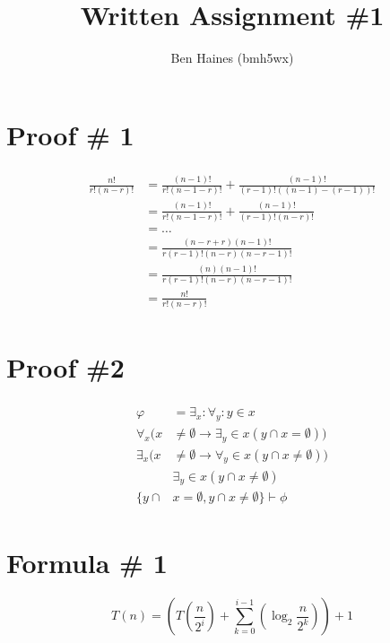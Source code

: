 \documentclass{article}
\begin{document}
\title{Written Assignment \#1}
\author{Ben Haines (bmh5wx)}

\section*{Proof \# 1}
\begin{align*}
    \begin{split}
        \frac{n!}{r!(n-r)!} &= \frac{(n-1)!}{r!(n-1-r)!} + \frac{(n-1)!}{(r-1)!((n-1)-(r-1))!}\\
                            &= \frac{(n-1)!}{r!(n-1-r)!} + \frac{(n-1)!}{(r-1)!(n-r)!}\\
                            &= \ldots\\
                            &= \frac{(n-r+r)(n-1)!}{r(r-1)!(n-r)(n-r-1)!}\\
                            &= \frac{(n)(n-1)!}{r(r-1)!(n-r)(n-r-1)!}\\
                            &= \frac{n!}{r!(n-r)!}
    \end{split}
\end{align*}

\section*{Proof \#2}
\begin{align*}
    \begin{split}
        \varphi &= \exists_x :\forall_y : y \in x\\
        \forall_x(x &\not= \emptyset \to \exists_y \in x(y\cap x = \emptyset))\\
        \exists_x(x &\not= \emptyset \to \forall_y \in x(y\cap x \not= \emptyset))\\
                    &\exists_y \in x(y\cap x \not= \emptyset)\\
        \{y\cap &x = \emptyset, y\cap x\not= \emptyset \} \vdash \phi
    \end{split}
\end{align*}

\section*{Formula \# 1}
$$T(n) = \left(T\left(\frac{n}{2^i}\right) + \sum\limits_{k=0}^{i-1}\left(\log_2\frac{n}{2^k}\right)\right) + 1$$
\end{document}
